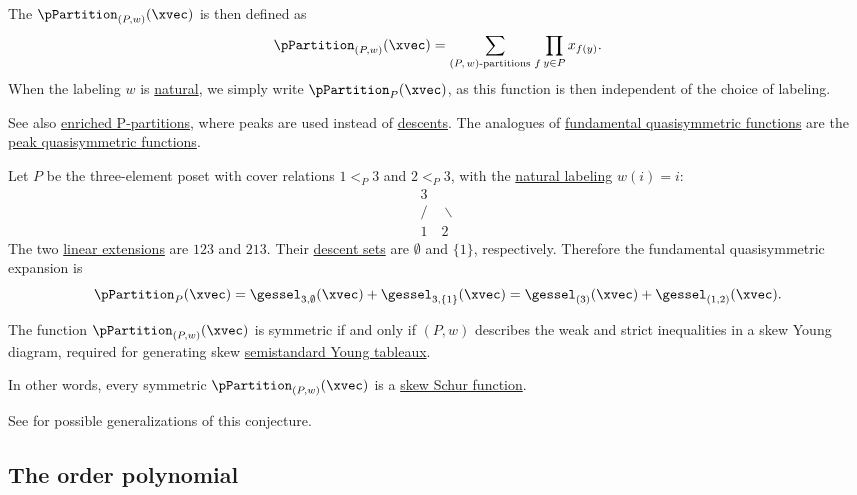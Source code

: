 The 
\label{pPartitionGeneratingFunction} $\pPartition_{(P,w)}(\xvec)$ is then
defined as
\[
\pPartition_{(P,w)}(\xvec)
= \sum_{\text{$(P,w)$-partitions } f} \prod_{y \in P} x_{f(y)}.
\]
When the labeling $w$ is \hyperref[naturalLabeling]{natural},
we simply write $\pPartition_{P}(\xvec)$, as this function is then independent
of the choice of labeling.

See also \hyperref[enrichedPPartitions]{enriched P-partitions}, where peaks
are used instead of \hyperref[descentSet]{descents}.
The analogues of \hyperref[gessel]{fundamental quasisymmetric functions} are the
\hyperref[peakQSym]{peak quasisymmetric functions}.

\begin{example*}
Let $P$ be the three-element poset with cover relations $1\lt_P 3$ and
$2\lt_P 3$, with the \hyperref[naturalLabeling]{natural labeling} $w(i)=i$:
\[
\begin{array}{c}
3\\[-2pt]
/\quad\backslash\\[-2pt]
1\quad 2
\end{array}
\]
The two \hyperref[linearExtension]{linear extensions} are $123$ and $213$.
Their \hyperref[descentSet]{descent sets} are
$\emptyset$ and $\{1\}$, respectively.  Therefore the fundamental
quasisymmetric expansion is
\[
\pPartition_P(\xvec)
=\gessel_{3,\emptyset}(\xvec)+\gessel_{3,\{1\}}(\xvec)
=\gessel_{(3)}(\xvec)+\gessel_{(1,2)}(\xvec).
\]
\end{example*}


\begin{conjecture}
The function $\pPartition_{(P,w)}(\xvec)$ is symmetric if and only if $(P,w)$
describes the weak and strict inequalities in a skew Young diagram,
required for generating skew
\hyperref[semistandardYoungTableau]{semistandard Young tableaux}.

In other words, every symmetric $\pPartition_{(P,w)}(\xvec)$ is a
\hyperref[schurSkew]{skew Schur function}.
\end{conjecture}
See \cite[Statement~3.11]{McNamara2006} for possible generalizations of this
conjecture.




\subsection[orderPolynomials]{The order polynomial}

